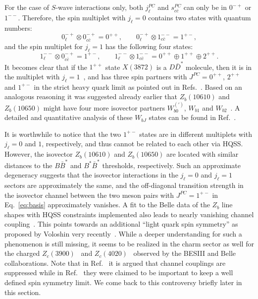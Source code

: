 For the case of $S$-wave interactions only, both ${j_\ell^{PC}}$ and ${s_{c\bar
c}^{PC}}$ can only be in $0^{-+}$ or $1^{--}$. Therefore, the spin multiplet 
with
${j_\ell=0}$ contains two states with quantum numbers:
\begin{equation}
  {0_\ell^{-+}}\otimes {0_{c\bar c}^{-+} } = 0^{++}, \qquad
    {0_\ell^{-+}}\otimes {1_{c\bar c}^{--} } = 1^{+-} ,
    \label{eq:sl0}
\end{equation}
and the spin multiplet for ${j_\ell=1}$ has the following four states:
\begin{equation}
  {1_\ell^{--}}\otimes {0_{c\bar c}^{-+} } = 1^{+-}, \qquad
    {1_\ell^{--}}\otimes {1_{c\bar c}^{--} } = 0^{++} \oplus
    {1^{++}} \oplus 2^{++} .
    \label{eq:sl1}
\end{equation}
It becomes clear that if the ${1^{++}}$ state $X(3872)$ is a $D\bar D^*$
molecule, then it is in the multiplet with $j_\ell=1$~\cite{Voloshin:2004mh}, 
and has three spin partners with $J^{PC}=0^{++}$, $2^{++}$ and
$1^{+-}$ in the strict heavy quark limit as pointed out in
Refs.~\cite{Hidalgo-Duque:2013pva,Baru:2016iwj}. Based on an
analogous reasoning it 
was suggested already earlier that  $Z_b(10610)$ and $Z_b(10650)$ might have four more 
isovector partners $W_{b0}^{(\prime)}$, $W^{}_{b1}$ and 
$W^{}_{b2}$~\cite{Bondar:2011ev,Voloshin:2011qa,Mehen:2011yh}. A detailed and
quantitative analysis of these $W_{bJ}$ states can be found in
Ref.~\cite{Baru:2017gwo}.

It is worthwhile to notice that the two $1^{+-}$ states are in different
multiplets with $j_\ell=0$ and $1$, respectively, and thus cannot be related to
each other via HQSS. However, the isovector $Z_b(10610)$ and $Z_b(10650)$ are
located with similar distances to the $B\bar B^*$ and $B^*\bar B^*$ thresholds,
respectively. Such an approximate degeneracy suggests that the isovector
interactions in the $j_\ell=0$ and $j_\ell=1$ sectors are approximately the
same, and the off-diagonal transition strength in the isovector channel between
the two meson pairs with $J^{PC}=1^{+-}$ in Eq.~\eqref{eq:basis} approximately
vanishes. A fit to the Belle data of the $Z_b$ line shapes with HQSS constraints
implemented also leads to nearly vanishing channel coupling~\cite{Guo:2016bjq}.
This points towards an additional ``light quark spin symmetry'' as proposed by
Voloshin very recently~\cite{Voloshin:2016cgm}. While a deeper understanding for
such a phenomenon is still missing, it seems to be realized in the charm sector as
well for the charged $Z_c(3900)$~\cite{Ablikim:2013mio,Liu:2013dau} and
$Z_c(4020)$~\cite{Ablikim:2013wzq} observed by the BESIII and Belle
collaborations.
Note that in Ref.~\cite{Valderrama:2012jv} 
it is argued that channel couplings are suppressed while in Ref.~\cite{Baru:2016iwj}
they were claimed to be important to keep a well defined spin symmetry limit.
We come back to this controversy briefly later in this section.

